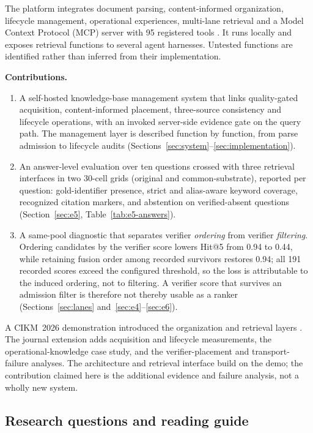 The platform integrates document parsing, content-informed
organization, lifecycle management, operational experiences, multi-lane
retrieval and a Model Context Protocol (MCP) server with 95 registered tools
\cite{mcp}. It runs locally and exposes retrieval functions to several agent
harnesses. Untested functions are identified rather than inferred from their
implementation.

\noindent\textbf{Contributions.}
\begin{enumerate}
\item A self-hosted knowledge-base management system that links quality-gated
acquisition, content-informed placement, three-source consistency and lifecycle
operations, with an invoked server-side evidence gate on the query path. The
management layer is described function by function, from parse admission to
lifecycle audits (Sections~\ref{sec:system}--\ref{sec:implementation}).
\item An answer-level evaluation over ten questions crossed with three
retrieval interfaces in two 30-cell grids (original and common-substrate),
reported per question: gold-identifier
presence, strict and alias-aware keyword coverage, recognized citation markers,
and abstention on verified-absent questions (Section~\ref{sec:e5},
Table~\ref{tab:e5-answers}).
\item A same-pool diagnostic that separates verifier \emph{ordering} from
verifier \emph{filtering}. Ordering candidates by the verifier score lowers
Hit@5 from 0.94 to 0.44, while retaining fusion order among recorded survivors
restores 0.94; all 191 recorded scores exceed the configured threshold, so the
loss is attributable to the induced ordering, not to filtering. A verifier
score that survives an admission filter is therefore not thereby usable as a
ranker (Sections~\ref{sec:lanes} and~\ref{sec:e4}--\ref{sec:e6}).
\end{enumerate}

A CIKM~2026 demonstration introduced the organization and retrieval layers
\cite{qdcvr-demo}. The journal extension adds acquisition and lifecycle
measurements, the operational-knowledge case study, and the verifier-placement
and transport-failure analyses. The architecture and retrieval interface build
on the demo; the contribution claimed here is the additional evidence and
failure analysis, not a wholly new system.

\subsection{Research questions and reading guide}
\label{sec:rq}


